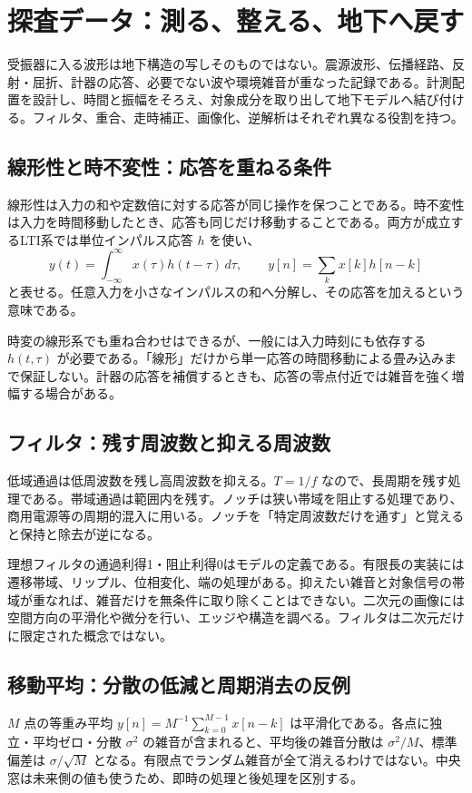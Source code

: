 \section{探査データ：測る、整える、地下へ戻す}
\label{theory:exploration:data}
受振器に入る波形は地下構造の写しそのものではない。震源波形、伝播経路、反射・屈折、計器の応答、必要でない波や環境雑音が重なった記録である。計測配置を設計し、時間と振幅をそろえ、対象成分を取り出して地下モデルへ結び付ける。フィルタ、重合、走時補正、画像化、逆解析はそれぞれ異なる役割を持つ。

\subsection{線形性と時不変性：応答を重ねる条件}
\label{theory:exploration:lti}
線形性は入力の和や定数倍に対する応答が同じ操作を保つことである。時不変性は入力を時間移動したとき、応答も同じだけ移動することである。両方が成立するLTI系では単位インパルス応答 \(h\) を使い、
\[
 y(t)=\int_{-\infty}^{\infty}x(\tau)h(t-\tau)\,d\tau,
 \qquad y[n]=\sum_k x[k]h[n-k]
\]
と表せる\cite{mit_signals2010}。任意入力を小さなインパルスの和へ分解し、その応答を加えるという意味である。

時変の線形系でも重ね合わせはできるが、一般には入力時刻にも依存する \(h(t,\tau)\) が必要である。「線形」だけから単一応答の時間移動による畳み込みまで保証しない。計器の応答を補償するときも、応答の零点付近では雑音を強く増幅する場合がある。

\subsection{フィルタ：残す周波数と抑える周波数}
\label{theory:exploration:filters}
低域通過は低周波数を残し高周波数を抑える。\(T=1/f\) なので、長周期を残す処理である。帯域通過は範囲内を残す。ノッチは狭い帯域を阻止する処理であり、商用電源等の周期的混入に用いる\cite{scipy_notch}。ノッチを「特定周波数だけを通す」と覚えると保持と除去が逆になる。

理想フィルタの通過利得1・阻止利得0はモデルの定義である。有限長の実装には遷移帯域、リップル、位相変化、端の処理がある。抑えたい雑音と対象信号の帯域が重なれば、雑音だけを無条件に取り除くことはできない。二次元の画像には空間方向の平滑化や微分を行い、エッジや構造を調べる。フィルタは二次元だけに限定された概念ではない。

\subsection{移動平均：分散の低減と周期消去の反例}
\label{theory:exploration:moving}
\(M\) 点の等重み平均 \(y[n]=M^{-1}\sum_{k=0}^{M-1}x[n-k]\) は平滑化である。各点に独立・平均ゼロ・分散 \(\sigma^2\) の雑音が含まれると、平均後の雑音分散は \(\sigma^2/M\)、標準偏差は \(\sigma/\sqrt{M}\) となる。有限点でランダム雑音が全て消えるわけではない。中央窓は未来側の値も使うため、即時の処理と後処理を区別する。

